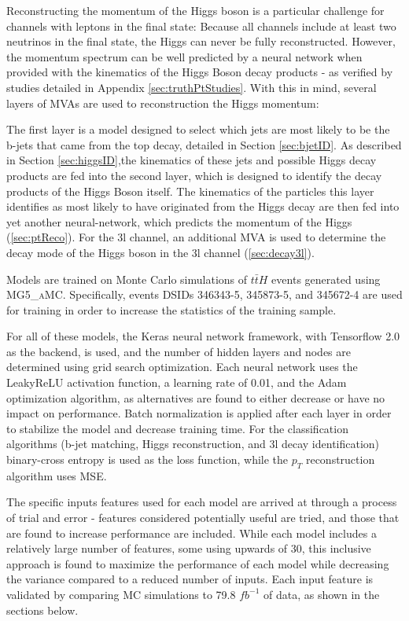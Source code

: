 Reconstructing the momentum of the Higgs boson is a particular challenge for channels with leptons in the final state: Because all channels include at least two neutrinos in the final state, the Higgs can never be fully reconstructed. However, the momentum spectrum can be well predicted by a neural network when provided with the kinematics of the Higgs Boson decay products - as verified by studies detailed in Appendix \ref{sec:truthPtStudies}. With this in mind, several layers of MVAs are used to reconstruction the Higgs momentum:

The first layer is a model designed to select which jets are most likely to be the b-jets that came from the top decay, detailed in Section \ref{sec:bjetID}. As described in Section \ref{sec:higgsID},the kinematics of these jets and possible Higgs decay products are fed into the second layer, which is designed to identify the decay products of the Higgs Boson itself. The kinematics of the particles this layer identifies as most likely to have originated from the Higgs decay are then fed into yet another neural-network, which predicts the momentum of the Higgs (\ref{sec:ptReco}). For the 3l channel, an additional MVA is used to determine the decay mode of the Higgs boson in the 3l channel (\ref{sec:decay3l}). 

Models are trained on Monte Carlo simulations of $t\bar{t}H$ events generated using \textsc{MG5\_aMC}. Specifically, events DSIDs 346343-5, 345873-5, and 345672-4 are used for training in order to increase the statistics of the training sample.

For all of these models, the Keras neural network framework, with Tensorflow 2.0 as the backend, is used, and the number of hidden layers and nodes are determined using grid search optimization. Each neural network uses the LeakyReLU activation function, a learning rate of 0.01, and the Adam optimization algorithm, as alternatives are found to either decrease or have no impact on performance. Batch normalization is applied after each layer in order to stabilize the model and decrease training time. For the classification algorithms (b-jet matching, Higgs reconstruction, and 3l decay identification) binary-cross entropy is used as the loss function, while the $p_T$ reconstruction algorithm uses MSE. 

The specific inputs features used for each model are arrived at through a process of trial and error - features considered potentially useful are tried, and those that are found to increase performance are included. While each model includes a relatively large number of features, some using upwards of 30, this inclusive approach is found to maximize the performance of each model while decreasing the variance compared to a reduced number of inputs. Each input feature is validated by comparing MC simulations to 79.8 $fb^{-1}$ of data, as shown in the sections below.

